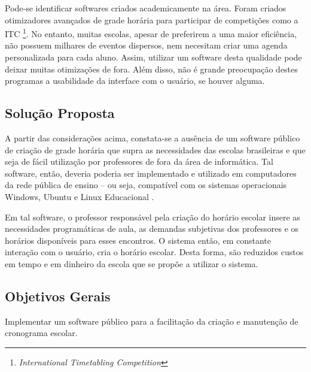 \documentclass[12pt,a4paper]{article}
\begin{document}
		\par Pode-se identificar softwares criados academicamente na área. Foram criados otimizadores avançados de grade horária para participar de competições como a ITC \footnote{\textit{International Timetabling Competition}}. No entanto, muitas escolas, apesar de preferirem a uma maior eficiência, não possuem milhares de eventos dispersos, nem necesitam criar uma agenda personalizada para cada aluno. Assim, utilizar um software desta qualidade pode deixar muitas otimizações de fora. Além disso, não é grande preocupação destes programas a usabilidade da interface com o usuário, se houver alguma.

		\subsection{Solução Proposta}

			 \par A partir das considerações acima, constata-se a ausência de um software público \cite{publico} de criação de grade horária que supra as necessidades das escolas brasileiras e que seja de fácil utilização por professores de fora da área de informática. Tal software, então, deveria poderia ser implementado e utilizado em computadores da rede pública de ensino -- ou seja, compatível com os sistemas operacionais Windows, Ubuntu e Linux Educacional \cite{proinfo, w3s}.

			 \par Em tal software, o professor responsável pela criação do horário escolar insere as necessidades programáticas de aula, as demandas subjetivas dos professores e os horários disponíveis para esses encontros. O sistema então, em constante interação com o usuário, cria o horário escolar.  Desta forma, são reduzidos custos em tempo e em dinheiro da escola que se propõe a utilizar o sistema.

		\subsection{Objetivos Gerais}

			\par Implementar um software público para a facilitação da criação e manutenção de cronograma escolar.
\end{document}
